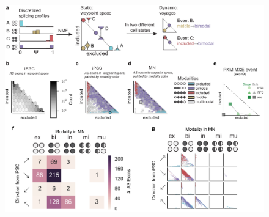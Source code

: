 \clearpage
\begin{figure}[h]
\ContinuedFloat
\captionsetup{labelformat=empty}
\centering
\includegraphics[width=5.8in]{figures/bonvoyage_overview.pdf}
\end{figure}
\clearpage

